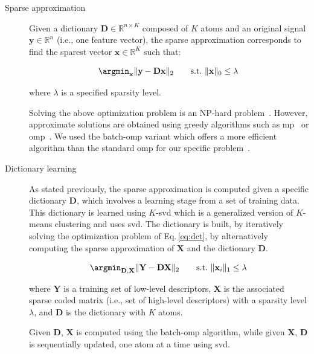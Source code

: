\begin{description}
\item[Sparse approximation] Given a dictionary $\mathbf{D} \in \mathbb{R}^{n \times K}$ composed of $K$ atoms and an original signal $\mathbf{y} \in \mathbb{R}^{n}$ (i.e., one feature vector), the sparse approximation corresponds to find the sparest vector $\mathbf{x} \in \mathbb{R}^{K}$ such that:

\begin{equation}
  \argmin_{\mathbf{x}}\|\mathbf{y - Dx} \|_{2} \qquad  \text{s.t.} \  \|\mathbf{x}\|_{0} \leq \lambda \, \label{eq:sprapp}
\end{equation}

\noindent where $\lambda$ is a specified sparsity level.

Solving the above optimization problem is an NP-hard problem~\cite{elad2010sparse}.
However, approximate solutions are obtained using greedy algorithms such as \ac{mp}~\cite{mallat1993matching} or \ac{omp}~\cite{pati1993orthogonal,davis1997adaptive}.
We used the batch-\ac{omp} variant which offers a more efficient algorithm than the standard \ac{omp} for our specific problem~\cite{rubinstein2008efficient}.

\item[Dictionary learning] As stated previously, the sparse approximation is computed given a specific dictionary $\mathbf{D}$, which involves a learning stage from a set of training data.
This dictionary is learned using $K$-\acs*{svd} which is a generalized version of $K$-means clustering and uses \ac{svd}. 
The dictionary is built, by iteratively solving the optimization problem of Eq.\,\ref{eq:dct}, by alternatively computing the sparse approximation of $\mathbf{X}$ and the dictionary $\mathbf{D}$.

\begin{equation}
  \argmin_{\mathbf{D,X}} \|\mathbf{Y} - \mathbf{D}\mathbf{X}\|_{2} \qquad  \text{s.t.} \  \|\mathbf{x}_{i}\|_{1} \leq \lambda \,\label{eq:dct}
\end{equation}

\noindent where $\mathbf{Y}$ is a training set of low-level descriptors, $\mathbf{X}$ is the associated sparse coded matrix (i.e., set of high-level descriptors) with a sparsity level $\lambda$, and $\mathbf{D}$ is the dictionary with $K$ atoms.

Given $\mathbf{D}$, $\mathbf{X}$ is computed using the batch-\ac{omp} algorithm, while given $\mathbf{X}$, $\mathbf{D}$ is sequentially updated, one atom at a time using \ac{svd}. 


\end{description}
